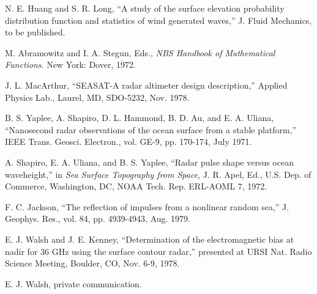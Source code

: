{\noindent[12] N. E. Huang and S. R. Long, ``A study of the surface elevation probability distribution function and statistics of wind generated waves,'' J. Fluid Mechanics, to be published.\par
\noindent[13] M. Abramowitz and I. A. Stegun, Eds., \emph{NBS Handbook of Mathematical Functions}. New York: Dover, 1972.\par
\noindent[14] J. L. MacArthur, ``SEASAT-A radar altimeter design description,'' Applied Physics Lab., Laurel, MD, SDO-5232, Nov. 1978.\par
\noindent[15] B. S. Yaplee, A. Shapiro, D. L. Hammond, B. D. Au, and E. A. Uliana, ``Nanosecond radar observations of the ocean surface from a stable platform,'' IEEE Trans. Geosci. Electron., vol. GE-9, pp. 170-174, July 1971.\par
\noindent[16] A. Shapiro, E. A. Uliana, and B. S. Yaplee, ``Radar pulse shape versus ocean waveheight,'' in \emph{Sea Surface Topography from Space}, J. R. Apel, Ed., U.S. Dep. of Commerce, Washington, DC, NOAA Tech. Rep. ERL-AOML 7, 1972.\par
\noindent[17] F. C. Jackson, ``The reflection of impulses from a nonlinear random sea,'' J. Geophys. Res., vol. 84, pp. 4939-4943, Aug. 1979.\par
\noindent[18] E. J. Walsh and J. E. Kenney, ``Determination of the electromagnetic bias at nadir for 36 GHz using the surface contour radar,'' presented at URSI Nat. Radio Science Meeting, Boulder, CO, Nov. 6-9, 1978.\par
\noindent[19] E. J. Walsh, private communication.\par
}
